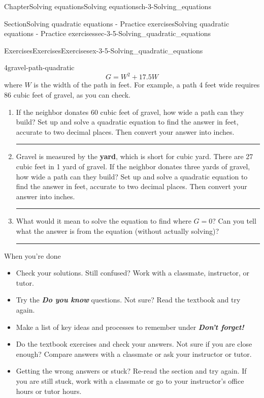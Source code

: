 \documentclass[twoside,11pt,]{book}
\newcommand{\alert}[1]{\textbf{\textit{#1}}}
\newcommand{\terminology}[1]{\textbf{#1}}
\newlength{\workspacestrutwidth}
\numberwithin{equation}{section}
\begin{document}
\begin{chapterptx}{Chapter}{Solving equations}{}{Solving equations}{}{}{ch-3-Solving_equations}
\begin{sectionptx}{Section}{Solving quadratic equations - Practice exercises}{}{Solving quadratic equations - Practice exercises}{}{}{sec-3-5-Solving_quadratic_equations}
\begin{exercises-subsection-numberless}{Exercises}{Exercises}{}{Exercises}{}{}{ex-3-5-Solving_quadratic_equations}
\begin{divisionexercise}{4}{}{}{gravel-path-quadratic}
\begin{equation*}
G = W^2 + 17.5W
\end{equation*}
where \(W\) is the width of the path in feet. For example, a path 4 feet wide requires 86 cubic feet of gravel, as you can check.%
\begin{enumerate}[label=(\alph*),ref=\alph*]%
\item{}If the neighbor donates 60 cubic feet of gravel, how wide a path can they build? Set up and solve a quadratic equation to find the answer in feet, accurate to two decimal places. Then convert your answer into inches.%
\par\rule{\workspacestrutwidth}{0.7in}%
\item{}Gravel is measured by the \terminology{yard}, which is short for cubic yard. There are 27 cubic feet in 1 yard of gravel. If the neighbor donates three yards of gravel, how wide a path can they build? Set up and solve a quadratic equation to find the answer in feet, accurate to two decimal places. Then convert your answer into inches.%
\par\rule{\workspacestrutwidth}{0.7in}%
\item{}What would it mean to solve the equation to find where \(G=0\)? Can you tell what the answer is from the equation (without actually solving)?%
\par\rule{\workspacestrutwidth}{0in}%
\end{enumerate}%
\end{divisionexercise}%
\end{exercises-subsection-numberless}
\begin{conclusion}{When you're done \textellipsis{}}%
%
\begin{itemize}[label=\textbullet]
\item{}Check your solutions. Still confused? Work with a classmate, instructor, or tutor.%
\item{}Try the \alert{Do you know} questions. Not sure? Read the textbook and try again.%
\item{}Make a list of key ideas and processes to remember under \alert{Don't forget!}%
\item{}Do the textbook exercises and check your answers. Not sure if you are close enough? Compare answers with a classmate or ask your instructor or tutor.%
\item{}Getting the wrong answers or stuck? Re-read the section and try again. If you are still stuck, work with a classmate or go to your instructor's office hours or tutor hours.%

\end{itemize}
\end{conclusion}
\end{sectionptx}
\end{chapterptx}
\end{document}
